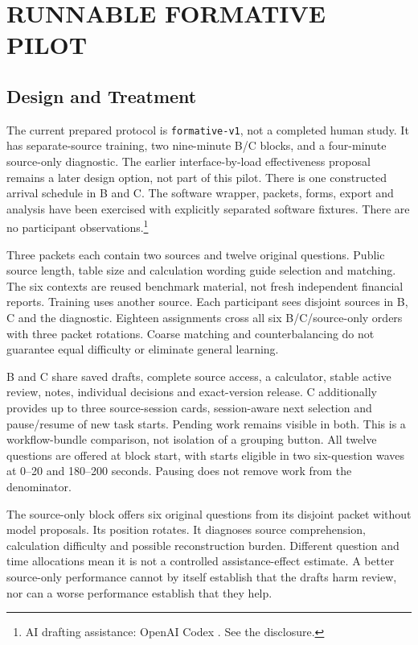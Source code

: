 \documentclass[a4paper,twoside]{article}
\newcommand{\credit}{\footnote{AI drafting assistance: OpenAI Codex \cite{codex}. See the disclosure.}}
\begin{document}
\section{RUNNABLE FORMATIVE PILOT}
\subsection{Design and Treatment}
The current prepared protocol is \texttt{formative-v1}, not a completed human study.
It has separate-source training, two nine-minute B/C blocks, and a four-minute
source-only diagnostic. The earlier interface-by-load effectiveness proposal
remains a later design option, not part of this pilot. There is one constructed
arrival schedule in B and C. The software wrapper, packets, forms, export and
analysis have been exercised with explicitly separated software fixtures. There
are no participant observations.\credit

Three packets each contain two sources and twelve original questions. Public
source length, table size and calculation wording guide selection and matching.
The six contexts are reused benchmark material, not fresh independent financial
reports. Training uses another source. Each participant sees disjoint sources in
B, C and the diagnostic. Eighteen assignments cross all six B/C/source-only orders
with three packet rotations. Coarse matching and counterbalancing do not guarantee
equal difficulty or eliminate general learning.

B and C share saved drafts, complete source access, a calculator, stable active
review, notes, individual decisions and exact-version release. C additionally
provides up to three source-session cards, session-aware next selection and
pause/resume of new task starts. Pending work remains visible in both. This is a
workflow-bundle comparison, not isolation of a grouping button. All twelve questions
are offered at block start, with starts eligible in two six-question waves at
0--20 and 180--200 seconds. Pausing does not remove work from the denominator.

The source-only block offers six original questions from its disjoint packet without
model proposals. Its position rotates. It diagnoses source comprehension, calculation
difficulty and possible reconstruction burden. Different question and time
allocations mean it is not a controlled assistance-effect estimate. A better
source-only performance cannot by itself establish that the drafts harm review,
nor can a worse performance establish that they help.
\end{document}
